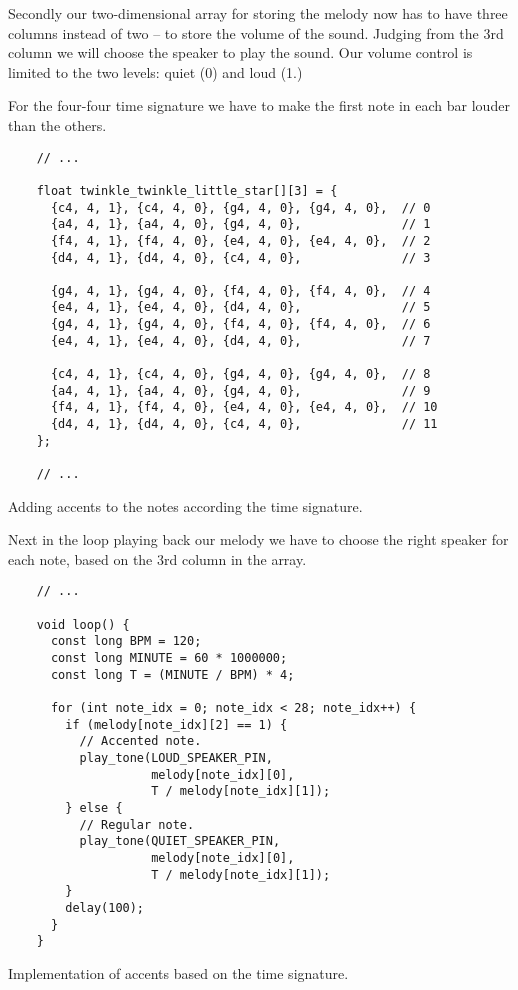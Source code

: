 \documentclass[../sparc.tex]{subfiles}
\begin{document}
Secondly our two-dimensional array for storing the melody now has to have three
columns instead of two -- to store the volume of the sound.  Judging from the 3rd
column we will choose the speaker to play the sound.  Our volume control is
limited to the two levels: quiet (0) and loud (1.)

For the four-four time signature we have to make the first note in each bar
louder than the others.

\begin{listing}[!h]
  \begin{verbatim}
    // ...

    float twinkle_twinkle_little_star[][3] = {
      {c4, 4, 1}, {c4, 4, 0}, {g4, 4, 0}, {g4, 4, 0},  // 0
      {a4, 4, 1}, {a4, 4, 0}, {g4, 4, 0},              // 1
      {f4, 4, 1}, {f4, 4, 0}, {e4, 4, 0}, {e4, 4, 0},  // 2
      {d4, 4, 1}, {d4, 4, 0}, {c4, 4, 0},              // 3

      {g4, 4, 1}, {g4, 4, 0}, {f4, 4, 0}, {f4, 4, 0},  // 4
      {e4, 4, 1}, {e4, 4, 0}, {d4, 4, 0},              // 5
      {g4, 4, 1}, {g4, 4, 0}, {f4, 4, 0}, {f4, 4, 0},  // 6
      {e4, 4, 1}, {e4, 4, 0}, {d4, 4, 0},              // 7

      {c4, 4, 1}, {c4, 4, 0}, {g4, 4, 0}, {g4, 4, 0},  // 8
      {a4, 4, 1}, {a4, 4, 0}, {g4, 4, 0},              // 9
      {f4, 4, 1}, {f4, 4, 0}, {e4, 4, 0}, {e4, 4, 0},  // 10
      {d4, 4, 1}, {d4, 4, 0}, {c4, 4, 0},              // 11
    };

    // ...
  \end{verbatim}
  \label{listing:adding-musical-scale-to-array}
  \caption{Adding accents to the notes according the time signature.}
\end{listing}

Next in the loop playing back our melody we have to choose the right speaker for
each note, based on the 3rd column in the array.

\begin{listing}[h]
  \begin{verbatim}
    // ...

    void loop() {
      const long BPM = 120;
      const long MINUTE = 60 * 1000000;
      const long T = (MINUTE / BPM) * 4;

      for (int note_idx = 0; note_idx < 28; note_idx++) {
        if (melody[note_idx][2] == 1) {
          // Accented note.
          play_tone(LOUD_SPEAKER_PIN,
                    melody[note_idx][0],
                    T / melody[note_idx][1]);
        } else {
          // Regular note.
          play_tone(QUIET_SPEAKER_PIN,
                    melody[note_idx][0],
                    T / melody[note_idx][1]);
        }
        delay(100);
      }
    }
  \end{verbatim}
  \label{listing:musical-scale-implementation}
  \caption{Implementation of accents based on the time signature.}
\end{listing}
\end{document}
